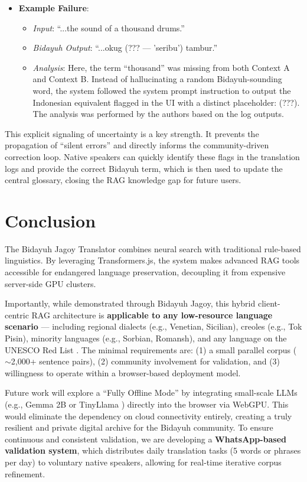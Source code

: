 \documentclass[12pt]{article}
\begin{document}
\begin{itemize}[leftmargin=10pt]
    \item \textbf{Example Failure}:
    \begin{itemize}
        \item \textit{Input}: ``...the sound of a thousand drums.''
        \item \textit{Bidayuh Output}: ``...okug (\textnormal{???} --- 'seribu') tambur.''
        \item \textit{Analysis}: Here, the term ``thousand'' was missing from both Context A and Context B. Instead of hallucinating a random Bidayuh-sounding word, the system followed the system prompt instruction to output the Indonesian equivalent flagged in the UI with a distinct placeholder: (\textnormal{???}). The analysis was performed by the authors based on the log outputs.
    \end{itemize}
\end{itemize}

This explicit signaling of uncertainty is a key strength. It prevents the propagation of ``silent errors'' and directly informs the community-driven correction loop. Native speakers can quickly identify these flags in the translation logs and provide the correct Bidayuh term, which is then used to update the central glossary, closing the RAG knowledge gap for future users.

\section{Conclusion}

The Bidayuh Jagoy Translator combines neural search with traditional rule-based linguistics. By leveraging Transformers.js, the system makes advanced RAG tools accessible for endangered language preservation, decoupling it from expensive server-side GPU clusters.

Importantly, while demonstrated through Bidayuh Jagoy, this hybrid client-centric RAG architecture is \textbf{applicable to any low-resource language scenario} --- including regional dialects (e.g., Venetian, Sicilian), creoles (e.g., Tok Pisin), minority languages (e.g., Sorbian, Romansh), and any language on the UNESCO Red List \cite{unesco2010atlas}. The minimal requirements are: (1) a small parallel corpus ($\sim$2,000+ sentence pairs), (2) community involvement for validation, and (3) willingness to operate within a browser-based deployment model.

Future work will explore a ``Fully Offline Mode'' by integrating small-scale LLMs (e.g., Gemma 2B \cite{gemma_2024} or TinyLlama \cite{zhang2024tinyllama}) directly into the browser via WebGPU. This would eliminate the dependency on cloud connectivity entirely, creating a truly resilient and private digital archive for the Bidayuh community.
 To ensure continuous and consistent validation, we are developing a \textbf{WhatsApp-based validation system}, which distributes daily translation tasks (5 words or phrases per day) to voluntary native speakers, allowing for real-time iterative corpus refinement.
\end{document}
